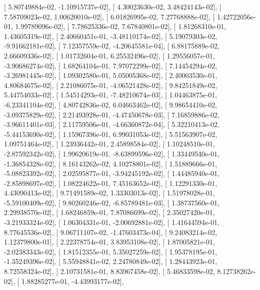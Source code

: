 \documentclass{article}
\begin{document}
       [  5.80749884e-02,  -1.10915737e-02],
       [  4.30023630e-02,   3.48424143e-02],
       [  7.58709023e-02,   1.00620010e-02],
       [  6.01826995e-02,   7.27768888e-02],
       [  1.42722056e-01,   1.99789096e-02],
       [  7.78625336e-02,   7.67840801e-02],
       [  1.81268310e-01,   1.43605319e-02],
       [  2.40660451e-01,  -3.48110174e-02],
       [  5.19079303e-02,  -9.91662181e-02],
       [  7.12357559e-02,  -4.20645581e-04],
       [  6.88175889e-02,   2.66609336e-02],
       [  1.01732604e-01,   6.25532496e-02],
       [  1.29556057e-01,  -3.90686274e-02],
       [  1.68264104e-01,   7.97072299e-02],
       [  7.14454294e-02,  -3.26981445e-02],
       [  1.09302580e-01,   5.05005368e-02],
       [  2.40003530e-01,   4.80684675e-02],
       [  2.21086075e-01,  -4.06521428e-02],
       [  9.84251849e-02,   5.44754033e-02],
       [  1.54514293e-01,  -7.48210674e-03],
       [  1.04463875e-01,  -6.23341104e-02],
       [  4.80742836e-02,   6.04663462e-02],
       [  9.98654410e-02,  -3.09375829e-02],
       [  2.21493928e-01,  -4.47450678e-03],
       [  7.16859886e-02,  -3.96611401e-03],
       [  2.11759506e-01,  -4.66360872e-04],
       [  5.32210413e-02,  -5.44153690e-02],
       [  1.15967396e-01,   6.99031053e-02],
       [  5.51563907e-02,   1.09751464e-02],
       [  1.23936442e-01,   2.45898584e-02],
       [  1.10248510e-01,  -2.87592342e-02],
       [  1.99620619e-01,  -8.63899596e-02],
       [  1.33449540e-01,  -1.36854328e-02],
       [  8.16143262e-02,   4.10278801e-02],
       [  1.51889666e-01,  -5.08823392e-02],
       [  2.02595877e-01,  -3.94245192e-02],
       [  1.44485940e-01,  -2.85898697e-02],
       [  1.08224622e-01,   7.45163652e-02],
       [  1.12291330e-01,   4.43090413e-02],
       [  9.71491589e-02,   1.33303013e-02],
       [  1.51978028e-01,  -5.59100409e-02],
       [  9.80260246e-02,  -6.85789481e-03],
       [  1.38737560e-01,   2.29938570e-02],
       [  1.68246859e-01,   7.87086699e-02],
       [  2.35027420e-01,  -3.21933324e-02],
       [  1.06304331e-01,  -2.00692881e-02],
       [  1.41644594e-01,   8.77645536e-02],
       [  9.06711107e-02,  -1.47603473e-04],
       [  9.24083214e-02,   1.12379800e-01],
       [  2.22378754e-01,   3.83953108e-02],
       [  1.87005821e-01,  -2.02383343e-02],
       [  1.81512355e-01,   5.35027259e-02],
       [  1.95378195e-01,  -1.35249396e-02],
       [  5.55948841e-02,   2.24780849e-02],
       [  1.28443923e-01,   8.72558324e-02],
       [  2.10731581e-01,   8.83967458e-02],
       [  5.46833598e-02,   8.12738262e-02],
       [  1.88285277e-01,  -4.43993177e-02],
\end{document}

